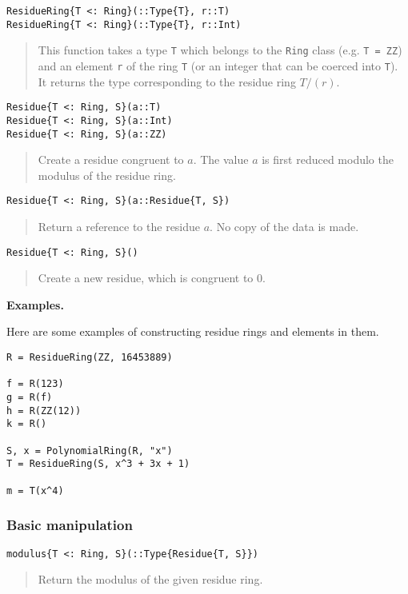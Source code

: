 \documentclass[a4paper,10pt]{article}
\newcommand{\code}{\lstinline}
\newcommand{\desc}[1]{\vspace{-3mm}\begin{quote}#1\end{quote}}
\begin{document}
{{{\begin{lstlisting}
ResidueRing{T <: Ring}(::Type{T}, r::T)
ResidueRing{T <: Ring}(::Type{T}, r::Int)
\end{lstlisting}

\desc{This function takes a type \code{T} which belongs to the \code{Ring}
class (e.g. \code{T = ZZ}) and an element \code{r} of the ring \code{T} (or
an integer that can be coerced into \code{T}). It returns the type 
corresponding to the residue ring $T/(r)$.}

\begin{lstlisting}
Residue{T <: Ring, S}(a::T)
Residue{T <: Ring, S}(a::Int)  
Residue{T <: Ring, S}(a::ZZ)  
\end{lstlisting}

\desc{Create a residue congruent to $a$. The value $a$ is first reduced
modulo the modulus of the residue ring.}

\begin{lstlisting}
Residue{T <: Ring, S}(a::Residue{T, S})  
\end{lstlisting}

\desc{Return a reference to the residue $a$. No copy of the data is made.}

\begin{lstlisting}
Residue{T <: Ring, S}()
\end{lstlisting}

\desc{Create a new residue, which is congruent to $0$.}

\textbf{Examples.}

Here are some examples of constructing residue rings and elements in them.

\begin{lstlisting}
R = ResidueRing(ZZ, 16453889)

f = R(123)
g = R(f)
h = R(ZZ(12))
k = R()

S, x = PolynomialRing(R, "x")
T = ResidueRing(S, x^3 + 3x + 1)

m = T(x^4)
\end{lstlisting}

\subsubsection{Basic manipulation}

\begin{lstlisting}
modulus{T <: Ring, S}(::Type{Residue{T, S}})
\end{lstlisting}

\desc{Return the modulus of the given residue ring.}

}}}
\end{document}
